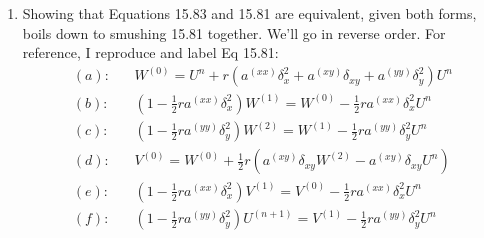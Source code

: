 \documentclass[11pt]{article}
\def\f{\frac }
\begin{document}
\begin{enumerate}
\item Showing that Equations 15.83 and 15.81 are equivalent, given both forms, boils down to smushing 15.81 together.
We'll go in reverse order.
For reference, I reproduce and label Eq 15.81:
\begin{align*} (a) : & ~~~~W^{(0)} = U^n + r \left ( a ^{(xx)} \delta _x ^2 + a^{(xy)} \delta _{xy} + a ^{(yy)} \delta _y ^ 2 \right ) U^n\\
(b) : & ~~~~\left ( 1 - \f{1}{2} r a ^{(xx)} \delta _x ^2 \right ) W^{(1)} = W^{(0)} - \f{1}{2} r a ^{(xx)} \delta _x ^ 2 U^n\\
(c) : & ~~~~\left ( 1 - \f{1}{2} r a ^{(yy)} \delta _y ^2 \right ) W^{(2)} = W^{(1)} - \f{1}{2} r a ^{(yy)} \delta _y ^ 2 U^n\\
(d) : & ~~~~V^{(0)} = W^{(0)} + \f{1}{2} r \left ( a^{(xy)} \delta _{xy} W^{(2)}  - a^{(xy)} \delta _{xy} U^n \right ) \\
(e) : & ~~~~\left ( 1 - \f{1}{2} r a ^{(xx)} \delta _x ^2 \right ) V^{(1)} = V^{(0)} - \f{1}{2} r a ^{(xx)} \delta _x ^ 2 U^n\\
(f) : & ~~~~\left ( 1 - \f{1}{2} r a ^{(yy)} \delta _y ^2 \right ) U^{(n+1)} = V^{(1)} - \f{1}{2} r a ^{(yy)} \delta _y ^ 2 U^n\end{align*}


\end{enumerate}
\end{document}
